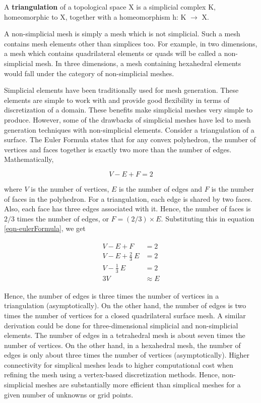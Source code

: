 \begin{definition}
	A \textbf{triangulation} of a topological space X is a simplicial complex K, homeomorphic to X, together with a homeomorphism h: K $\rightarrow$ X.
\end{definition}

A non-simplicial mesh is simply a mesh which is not simplicial. Such a mesh contains mesh elements other than simplices too. For example, in two dimensions, a mesh which contains quadrilateral elements or quads will be called a non-simplicial mesh. In three dimensions, a mesh containing hexahedral elements would fall under the category of non-simplicial meshes.

Simplicial elements have been traditionally used for mesh generation. These elements are simple to work with and provide good flexibility in terms of discretization of a domain. These benefits make simplicial meshes very simple to produce. However, some of the drawbacks of simplicial meshes have led to mesh generation techniques with non-simplicial elements. Consider a triangulation of a surface. The Euler Formula states that for any convex polyhedron, the number of vertices and faces together is exactly two more than the number of edges. Mathematically,

\begin{equation}
V-E+F=2
\label{eqn-eulerFormula}
\end{equation}

where $V$ is the number of vertices, $E$ is the number of edges and $F$ is the number of faces in the polyhedron. For a triangulation, each edge is shared by two faces. Also, each face has three edges associated with it. Hence, the number of faces is $2/3$ times the number of edges, or $F= (2/3) \times E$. Substituting this in equation \ref{eqn-eulerFormula}, we get

\begin{align}
\begin{split}
		V - E + F  & = 2 \\
		V - E + \frac{2}{3} \: E & = 2 \\
		V - \frac{1}{3} \: E & = 2 \\
		3V & \approx E
		\end{split}
\end{align}

Hence, the number of edges is three times the number of vertices in a triangulation (asymptotically). On the other hand, the number of edges is two times the number of vertices for a closed quadrilateral surface mesh. A similar derivation could be done for three-dimensional simplicial and non-simplicial elements. The number of edges in a tetrahedral mesh is about seven times the number of vertices. On the other hand, in a hexahedral mesh, the number of edges is only about three times the number of vertices (asymptotically). Higher connectivity for simplical meshes leads to higher computational cost when refining the mesh using a vertex-based discretization methods. Hence, non-simplicial meshes are substantially more efficient than simplical meshes for a given number of unknowns or grid points.

